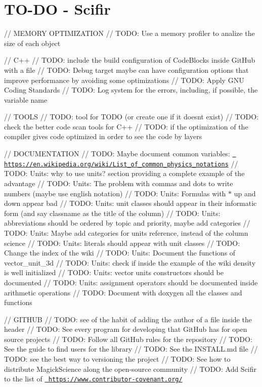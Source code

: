 \chapter{TO-\/\+DO -\/ Scifir}
\hypertarget{md_TO-DO_01-_01Scifir}{}\label{md_TO-DO_01-_01Scifir}
// MEMORY OPTIMIZATION // TODO\+: Use a memory profiler to analize the size of each object

// C++ // TODO\+: include the build configuration of Code\+Blocks inside Git\+Hub with a file // TODO\+: Debug target maybe can have configuration options that improve performance by avoiding some optimizations // TODO\+: Apply GNU Coding Standards // TODO\+: Log system for the errors, including, if possible, the variable name

// TOOLS // TODO\+: tool for TODO (or create one if it doesn\textquotesingle{}t exist) // TODO\+: check the better code scan tools for C++ // TODO\+: if the optimization of the compiler gives code optimized in order to see the code by layers

// DOCUMENTATION // TODO\+: Maybe document common variables\+: \href{https://en.wikipedia.org/wiki/List_of_common_physics_notations}{\texttt{ https\+://en.\+wikipedia.\+org/wiki/\+List\+\_\+of\+\_\+common\+\_\+physics\+\_\+notations}} // TODO\+: Units\+: why to use units? section providing a complete example of the advantage // TODO\+: Units\+: The problem with commas and dots to write numbers (maybe use english notation) // TODO\+: Units\+: Formulas with \texorpdfstring{$\ast$}{*} up and down appear bad // TODO\+: Units\+: unit classes should appear in their informatic form (and say classname as the title of the column) // TODO\+: Units\+: abbreviations should be ordered by topic and priority, maybe add categories // TODO\+: Units\+: Maybe add categories for units reference, instead of the column science // TODO\+: Units\+: literals should appear with unit classes // TODO\+: Change the index of the wiki // TODO\+: Units\+: Document the functions of vector\+\_\+unit\+\_\+3d // TODO\+: Units\+: check if inside the example of the wiki density is well initialized // TODO\+: Units\+: vector units constructors should be documented // TODO\+: Units\+: assignment operators should be documented inside arithmetic operations // TODO\+: Document with doxygen all the classes and functions

// GITHUB // TODO\+: see of the habit of adding the author of a file inside the header // TODO\+: See every program for developing that Git\+Hub has for open source projects // TODO\+: Follow all Git\+Hub rules for the repository // TODO\+: See the guide to find users for the library // TODO\+: See the INSTALL.\+md file // TODO\+: see the best way to versioning the project // TODO\+: See how to distribute Magick\+Science along the open-\/source community // TODO\+: Add Scifir to the list of \href{https://www.contributor-covenant.org/}{\texttt{ https\+://www.\+contributor-\/covenant.\+org/}}

